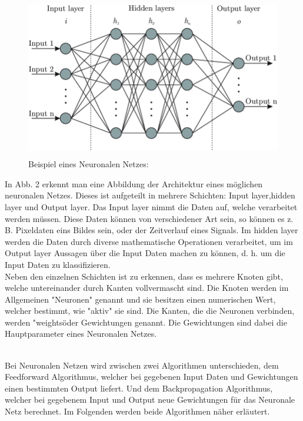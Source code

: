 \begin{figure}[H]
    \centering
    \includegraphics[height= 7cm, width = \textwidth]{Pictures/NN_Concept.png}
    \caption{Beispiel eines Neuronalen Netzes:}
\end{figure}


In Abb. 2 erkennt man eine Abbildung der Architektur eines möglichen neuronalen Netzes. Dieses ist aufgeteilt in mehrere Schichten: Input layer,hidden layer und Output layer. Das Input layer nimmt die Daten auf, welche verarbeitet werden müssen. Diese Daten können von verschiedener Art sein, so können es z. B. Pixeldaten eins Bildes sein, oder der Zeitverlauf eines Signals. Im hidden layer werden die Daten durch diverse mathematische Operationen verarbeitet, um im Output layer Aussagen über die Input Daten machen zu können, d. h. um die Input Daten zu klassifizieren.
\\
Neben den einzelnen Schichten ist zu erkennen, dass es mehrere Knoten gibt, welche untereinander durch Kanten vollvermascht sind. Die Knoten werden im Allgemeinen "Neuronen" genannt und sie besitzen einen numerischen Wert, welcher bestimmt, wie "aktiv" sie sind. Die Kanten, die die Neuronen verbinden, werden "weights\" oder Gewichtungen genannt. Die Gewichtungen sind dabei die Hauptparameter eines Neuronalen Netzes.

\\
Bei Neuronalen Netzen wird zwischen zwei Algorithmen unterschieden, dem Feedforward Algorithmus, welcher bei gegebenen Input Daten und Gewichtungen einen bestimmten Output liefert. Und dem Backpropagation Algorithmus, welcher bei gegebenem Input und Output neue Gewichtungen für das Neuronale Netz berechnet. Im Folgenden werden beide Algorithmen näher erläutert. 



